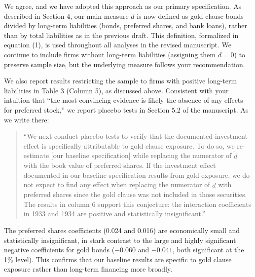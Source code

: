 \begin{itemize}
    \bigskip

    We agree, and we have adopted this approach as our primary specification. As described in Section 4, our main measure $d$ is now defined as gold clause bonds divided by long-term liabilities (bonds, preferred shares, and bank loans), rather than by total liabilities as in the previous draft. This definition, formalized in equation (1), is used throughout all analyses in the revised manuscript. We continue to include firms without long-term liabilities (assigning them $d = 0$) to preserve sample size, but the underlying measure follows your recommendation.
    
    We also report results restricting the sample to firms with positive long-term liabilities in Table 3 (Column 5), as discussed above. Consistent with your intuition that ``the most convincing evidence is likely the absence of any effects for preferred stock,'' we report placebo tests in Section 5.2 of the manuscript. As we write there:
    
    \begin{quote}
    ``We next conduct placebo tests to verify that the documented investment effect is specifically attributable to gold clause exposure. To do so, we re-estimate [our baseline specification] while replacing the numerator of $\tilde{d}$ with the book value of preferred shares. If the investment effect documented in our baseline specification results from gold exposure, we do not expect to find any effect when replacing the numerator of $\tilde{d}$ with preferred shares since the gold clause was not included in those securities. The results in column 6 support this conjecture: the interaction coefficients in 1933 and 1934 are positive and statistically insignificant.''
    \end{quote}
    
    The preferred shares coefficients (0.024 and 0.016) are economically small and statistically insignificant, in stark contrast to the large and highly significant negative coefficients for gold bonds ($-0.060$ and $-0.041$, both significant at the 1\% level). This confirms that our baseline results are specific to gold clause exposure rather than long-term financing more broadly.  
    
\end{itemize}
